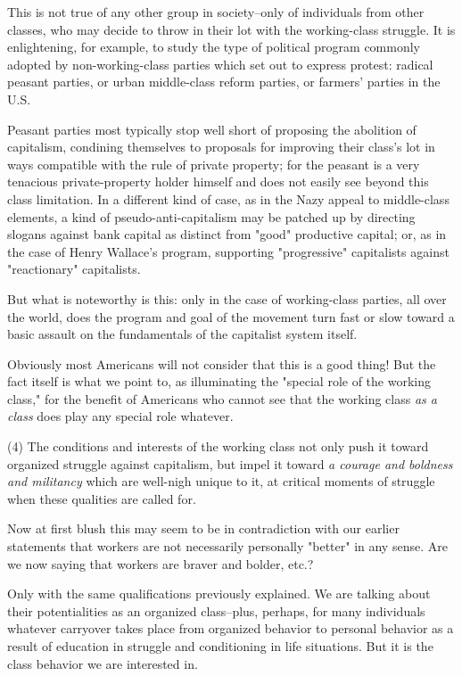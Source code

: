 This is not true of any other group in society--only of individuals from other classes, who may decide to throw in their lot with the working-class struggle. It is enlightening, for example, to study the type of political program commonly adopted by non-working-class parties which set out to express protest: radical peasant parties, or urban middle-class reform parties, or farmers' parties in the U.S.

Peasant parties most typically stop well short of proposing the abolition of capitalism, condining themselves to proposals for improving their class's lot in ways compatible with the rule of private property; for the peasant is a very tenacious private-property holder himself and does not easily see beyond this class limitation. In a different kind of case, as in the Nazy appeal to middle-class elements, a kind of pseudo-anti-capitalism may be patched up by directing slogans against bank capital as distinct from "good" productive capital; or, as in the case of Henry Wallace's program, supporting "progressive" capitalists against "reactionary" capitalists.

But what is noteworthy is this: only in the case of working-class parties, all over the world, does the program and goal of the movement turn fast or slow toward a basic assault on the fundamentals of the capitalist system itself.

Obviously most Americans will not consider that this is a good thing! But the fact itself is what we point to, as illuminating the "special role of the working class," for the benefit of Americans who cannot see that the working class \emph{as a class} does play any special role whatever.

(4) The conditions and interests of the working class not only push it toward organized struggle against capitalism, but impel it toward \emph{a courage and boldness and militancy} which are well-nigh unique to it, at critical moments of struggle when these qualities are called for.

Now at first blush this may seem to be in contradiction with our earlier statements that workers are not necessarily personally "better" in any sense. Are we now saying that workers are braver and bolder, etc.?

Only with the same qualifications previously explained. We are talking about their potentialities as an organized class--plus, perhaps, for many individuals whatever carryover takes place from organized behavior to personal behavior as a result of education in struggle and conditioning in life situations. But it is the class behavior we are interested in.

